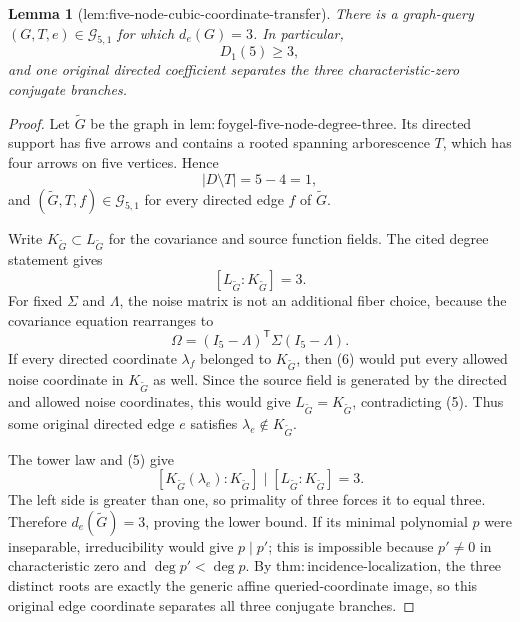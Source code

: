 \documentclass{article}
\newtheorem{lemma}{Lemma}
\begin{document}
\begin{lemma}[lem:five-node-cubic-coordinate-transfer]\label{lem:five-node-cubic-coordinate-transfer}
There is a graph-query \((G,T,e)\in\mathcal G_{5,1}\) for which \(d_e(G)=3\). In particular,
\[
 D_1(5)\geq3,
\]
and one original directed coefficient separates the three characteristic-zero conjugate branches.
\end{lemma}
\begin{proof}
Let \(\widetilde G\) be the graph in \(\mathrm{lem:foygel\mbox{-}five\mbox{-}node\mbox{-}degree\mbox{-}three}\). Its directed support has five arrows and contains a rooted spanning arborescence \(T\), which has four arrows on five vertices. Hence
\[
 |D\setminus T|=5-4=1,
\]
and \((\widetilde G,T,f)\in\mathcal G_{5,1}\) for every directed edge \(f\) of \(\widetilde G\).

Write \(K_{\widetilde G}\subset L_{\widetilde G}\) for the covariance and source function fields. The cited degree statement gives
\[
 [L_{\widetilde G}:K_{\widetilde G}]=3.
 \tag{5}
\]
For fixed \(\Sigma\) and \(\Lambda\), the noise matrix is not an additional fiber choice, because the covariance equation rearranges to
\[
 \Omega=(I_5-\Lambda)^{\mathsf T}\Sigma(I_5-\Lambda).
 \tag{6}
\]
If every directed coordinate \(\lambda_f\) belonged to \(K_{\widetilde G}\), then (6) would put every allowed noise coordinate in \(K_{\widetilde G}\) as well. Since the source field is generated by the directed and allowed noise coordinates, this would give \(L_{\widetilde G}=K_{\widetilde G}\), contradicting (5). Thus some original directed edge \(e\) satisfies \(\lambda_e\notin K_{\widetilde G}\).

The tower law and (5) give
\[
 [K_{\widetilde G}(\lambda_e):K_{\widetilde G}]
 \mid [L_{\widetilde G}:K_{\widetilde G}]=3.
\]
The left side is greater than one, so primality of three forces it to equal three. Therefore \(d_e(\widetilde G)=3\), proving the lower bound. If its minimal polynomial \(p\) were inseparable, irreducibility would give \(p\mid p'\); this is impossible because \(p'\neq0\) in characteristic zero and \(\deg p'<\deg p\). By \(\mathrm{thm:incidence\mbox{-}localization}\), the three distinct roots are exactly the generic affine queried-coordinate image, so this original edge coordinate separates all three conjugate branches.
\end{proof}
\end{document}
